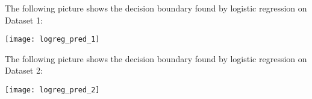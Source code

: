 \begin{answer}

\graphicspath{ {./linearclass/} }

The following picture shows the decision boundary found by logistic regression on Dataset 1:

\texttt{[image: logreg\_pred\_1]}

The following picture shows the decision boundary found by logistic regression on Dataset 2:

\texttt{[image: logreg\_pred\_2]}



\end{answer}
